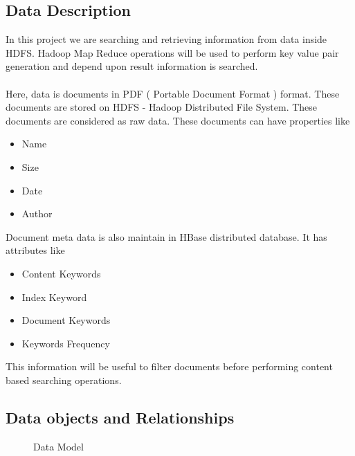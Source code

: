 \documentclass[oneside,a4paper,12pt]{report}
\begin{document}
\subsection{Data Description}
In this project we are searching and retrieving information from data inside HDFS. Hadoop Map Reduce operations will be used to perform key value pair generation and depend upon result information is searched.\\\\
Here, data is documents in PDF ( Portable Document Format ) format. These documents are stored on HDFS - Hadoop Distributed File System. These documents are considered as raw data. These documents can have properties like
\begin{itemize}
\item Name
\item Size
\item Date
\item Author
\end{itemize}
Document meta data is also maintain in HBase distributed database. It has attributes like
\begin{itemize}
\item Content Keywords
\item Index Keyword
\item Document Keywords
\item Keywords Frequency
\end{itemize}
This information will be useful to filter documents before performing content based  searching operations.



\subsection{Data objects and Relationships}
\begin{center}
	\begin{figure}[H]
		\centering
	  \caption{Data Model}
	  \label{fig:data-model}
	\end{figure}
\end{center}  
 
\end{document}
